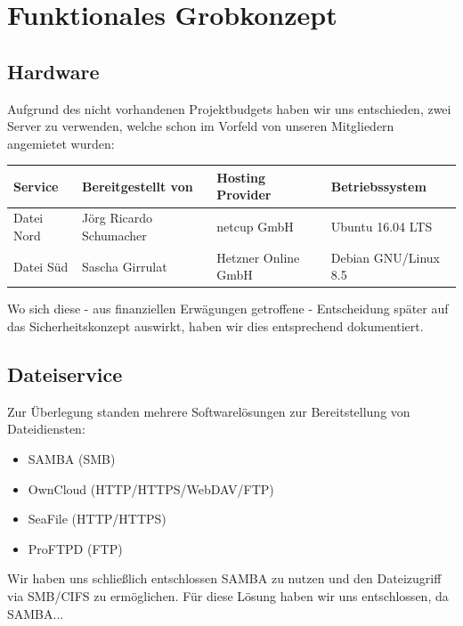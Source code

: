 \newpage
\section{Funktionales Grobkonzept}

\subsection{Hardware}

Aufgrund des nicht vorhandenen Projektbudgets haben wir uns entschieden, zwei Server zu verwenden, welche schon im Vorfeld von unseren Mitgliedern angemietet wurden:

\begin{minipage}{\textwidth}
\begin{center}
\begin{tabular}{llll}
\toprule
Service & Bereitgestellt von & Hosting Provider & Betriebssystem \\
\midrule
Datei Nord & Jörg Ricardo Schumacher & netcup GmbH & Ubuntu 16.04 LTS \\
Datei Süd & Sascha Girrulat & Hetzner Online GmbH & Debian GNU/Linux 8.5 \\
\bottomrule
\end{tabular}
\end{center}
\end{minipage}\bigskip

Wo sich diese - aus finanziellen Erwägungen getroffene - Entscheidung später auf das Sicherheitskonzept auswirkt, haben wir dies entsprechend dokumentiert.

\subsection{Dateiservice}
Zur Überlegung standen mehrere Softwarelösungen zur Bereitstellung von Dateidiensten:

\begin{itemize}
\item SAMBA (SMB)
\item OwnCloud (HTTP/HTTPS/WebDAV/FTP)
\item SeaFile (HTTP/HTTPS)
\item ProFTPD (FTP)
\end{itemize}
Wir haben uns schließlich entschlossen SAMBA zu nutzen und den Dateizugriff via SMB/CIFS zu ermöglichen. Für diese Lösung haben wir uns entschlossen, da SAMBA...


